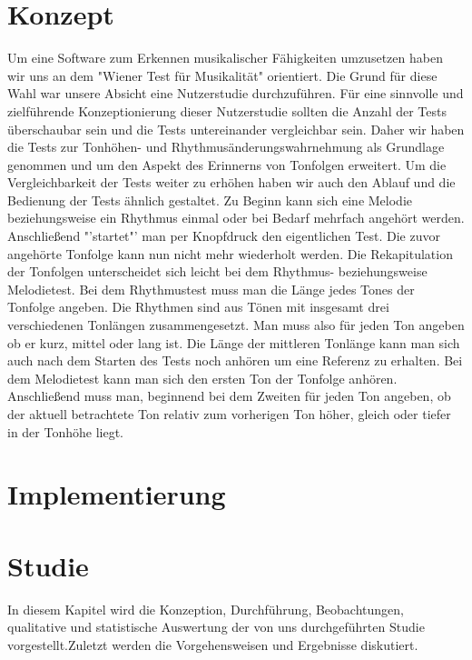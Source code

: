 \documentclass{acm_proc_article-sp}
\begin{document}
\section{Konzept}
Um eine Software zum Erkennen musikalischer Fähigkeiten umzusetzen haben wir uns an dem "Wiener Test für Musikalität" orientiert.
Die Grund für diese Wahl war unsere Absicht eine Nutzerstudie durchzuführen. Für eine sinnvolle und zielführende Konzeptionierung dieser Nutzerstudie sollten die Anzahl der Tests überschaubar sein und die Tests untereinander vergleichbar sein.
Daher wir haben die Tests zur Tonhöhen- und Rhythmusänderungswahrnehmung als Grundlage genommen und um den Aspekt des Erinnerns von Tonfolgen erweitert.
Um die Vergleichbarkeit der Tests weiter zu erhöhen haben wir auch den Ablauf und die Bedienung der Tests ähnlich gestaltet.
Zu Beginn kann sich eine Melodie beziehungsweise ein Rhythmus einmal oder bei Bedarf mehrfach angehört werden. Anschließend "'startet"' man per Knopfdruck den eigentlichen Test. Die zuvor angehörte Tonfolge kann nun nicht mehr wiederholt werden. Die Rekapitulation der Tonfolgen unterscheidet sich leicht bei dem Rhythmus- beziehungsweise Melodietest. Bei dem Rhythmustest muss man die Länge jedes Tones der Tonfolge angeben. Die Rhythmen sind aus Tönen mit insgesamt drei verschiedenen Tonlängen zusammengesetzt. Man muss also für jeden Ton angeben ob er kurz, mittel oder lang ist. Die Länge der mittleren Tonlänge kann man sich auch nach dem Starten des Tests noch anhören um eine Referenz zu erhalten.
Bei dem Melodietest kann man sich den ersten Ton der Tonfolge anhören. Anschließend muss man, beginnend bei dem Zweiten für jeden Ton angeben, ob der aktuell betrachtete Ton relativ zum vorherigen Ton höher, gleich oder tiefer in der Tonhöhe liegt.

\section{Implementierung}

\section{Studie}
In diesem Kapitel wird die Konzeption, Durchführung, Beobachtungen, qualitative und statistische Auswertung der von uns durchgeführten Studie vorgestellt.Zuletzt werden die Vorgehensweisen und Ergebnisse diskutiert.
\end{document}
